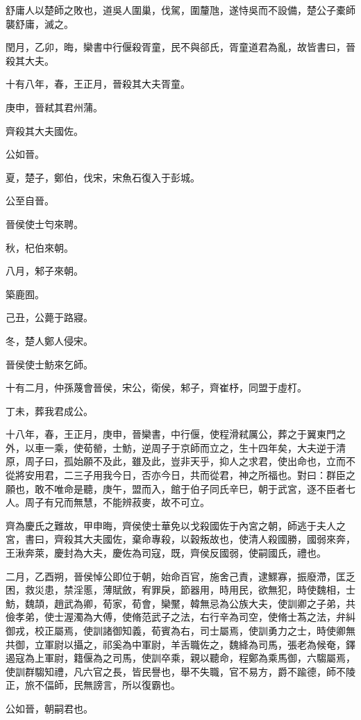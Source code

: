 \begin{pinyinscope}
舒庸人以楚師之敗也，道吳人圍巢，伐駕，圍釐虺，遂恃吳而不設備，楚公子橐師襲舒庸，滅之。

閏月，乙卯，晦，欒書中行偃殺胥童，民不與郤氏，胥童道君為亂，故皆書曰，晉殺其大夫。

十有八年，春，王正月，晉殺其大夫胥童。

庚申，晉弒其君州蒲。

齊殺其大夫國佐。

公如晉。

夏，楚子，鄭伯，伐宋，宋魚石復入于彭城。

公至自晉。

晉侯使士匄來聘。

秋，杞伯來朝。

八月，邾子來朝。

築鹿囿。

己丑，公薨于路寢。

冬，楚人鄭人侵宋。

晉侯使士魴來乞師。

十有二月，仲孫蔑會晉侯，宋公，衛侯，邾子，齊崔杼，同盟于虛朾。

丁未，葬我君成公。

十八年，春，王正月，庚申，晉欒書，中行偃，使程滑弒厲公，葬之于翼東門之外，以車一乘，使荀罃，士魴，逆周子于京師而立之，生十四年矣，大夫逆于清原，周子曰，孤始願不及此，雖及此，豈非天乎，抑人之求君，使出命也，立而不從將安用君，二三子用我今日，否亦今日，共而從君，神之所福也。對曰：群臣之願也，敢不唯命是聽，庚午，盟而入，館于伯子同氏辛巳，朝于武宮，逐不臣者七人。周子有兄而無慧，不能辨菽麥，故不可立。

齊為慶氏之難故，甲申晦，齊侯使士華免以戈殺國佐于內宮之朝，師逃于夫人之宮，書曰，齊殺其大夫國佐，棄命專殺，以穀叛故也，使清人殺國勝，國弱來奔，王湫奔萊，慶封為大夫，慶佐為司寇，既，齊侯反國弱，使嗣國氏，禮也。

二月，乙酉朔，晉侯悼公即位于朝，始命百官，施舍己責，逮鰥寡，振廢滯，匡乏困，救災患，禁淫慝，薄賦斂，宥罪戾，節器用，時用民，欲無犯，時使魏相，士魴，魏頡，趙武為卿，荀家，荀會，欒黶，韓無忌為公族大夫，使訓卿之子弟，共儉孝弟，使士渥濁為大傅，使脩范武子之法，右行辛為司空，使脩士蒍之法，弁糾御戎，校正屬焉，使訓諸御知義，荀賓為右，司士屬焉，使訓勇力之士，時使卿無共御，立軍尉以攝之，祁奚為中軍尉，羊舌職佐之，魏絳為司馬，張老為候奄，鐸遏寇為上軍尉，籍偃為之司馬，使訓卒乘，親以聽命，程鄭為乘馬御，六騶屬焉，使訓群騶知禮，凡六官之長，皆民譽也，舉不失職，官不易方，爵不踰德，師不陵正，旅不偪師，民無謗言，所以復霸也。

公如晉，朝嗣君也。


\end{pinyinscope}

